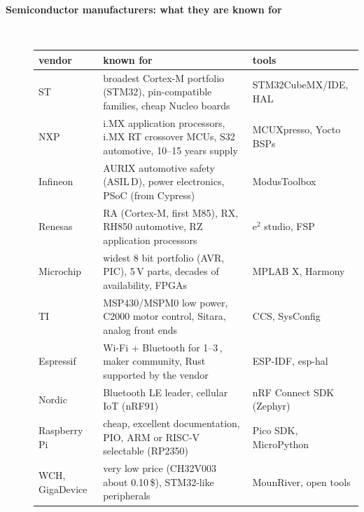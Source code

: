 \begin{description}
\item[{\rot\bf Semiconductor manufacturers: what they are known for}]~\\[-\lblskip]
\begin{center}
{\footnotesize
\begin{tabularx}{\linewidth}{|>{\raggedright}p{24mm}|L|>{\raggedright\arraybackslash}p{36mm}|}
\hline
\textbf{vendor} & \textbf{known for} & \textbf{tools} \\
\hline
ST & broadest Cortex-M portfolio (STM32), pin-compatible families, cheap Nucleo boards & STM32CubeMX/IDE, HAL \\
NXP & i.MX application processors, i.MX RT crossover MCUs, S32 automotive, 10--15 years supply & MCUXpresso, Yocto BSPs \\
Infineon & AURIX automotive safety (ASIL\,D), power electronics, PSoC (from Cypress) & ModusToolbox \\
Renesas & RA (Cortex-M, first M85), RX, RH850 automotive, RZ application processors & e$^2$ studio, FSP \\
Microchip & widest 8 bit portfolio (AVR, PIC), 5\,V parts, decades of availability, FPGAs & MPLAB X, Harmony \\
TI & MSP430/MSPM0 low power, C2000 motor control, Sitara, analog front ends & CCS, SysConfig \\
Espressif & Wi-Fi + Bluetooth for 1--3\,\texteuro{}, maker community, Rust supported by the vendor & ESP-IDF, esp-hal \\
Nordic & Bluetooth LE leader, cellular IoT (nRF91) & nRF Connect SDK (Zephyr) \\
Raspberry Pi & cheap, excellent documentation, PIO, ARM or RISC-V selectable (RP2350) & Pico SDK, MicroPython \\
WCH, GigaDevice & very low price (CH32V003 about 0.10\,\$), STM32-like peripherals & MounRiver, open tools \\
\hline
\end{tabularx}}
\end{center}
\os{\newpage}


\end{description}
